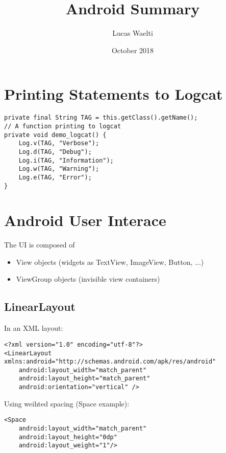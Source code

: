 \documentclass[11pt]{article}
\title{Android Summary}
\author{Lucas Waelti }
\date{October 2018}
\begin{document}
\maketitle
\tableofcontents
\newpage

\begin{comment}
Here is some source code:
\begin{lstlisting}
// Hello.java
import javax.swing.JApplet;
import java.awt.Graphics;

public class Hello extends JApplet {
    public void paintComponent(Graphics g) {
        g.drawString("Hello, world!", 65, 95);
    }
    int a = 10;
}
\end{lstlisting}

That's it folks!
\begin{verbatim}
Or use verbatim to write some pseudocode!
\end{verbatim}
\end{comment}

\section{Printing Statements to Logcat}
\lstset{language = Java}
\begin{lstlisting}
private final String TAG = this.getClass().getName();
// A function printing to logcat
private void demo_logcat() {
    Log.v(TAG, "Verbose");
    Log.d(TAG, "Debug");
    Log.i(TAG, "Information");
    Log.w(TAG, "Warning");
    Log.e(TAG, "Error");
}
\end{lstlisting}

\section{Android User Interace}
The UI is composed of 
\begin{itemize}
    \item View objects (widgets as TextView, ImageView, Button, ...)
    \item ViewGroup objects (invisible view containers)
\end{itemize}

\subsection{LinearLayout}
In an XML layout:
\lstset{language = XML}
\begin{lstlisting}
<?xml version="1.0" encoding="utf-8"?>
<LinearLayout xmlns:android="http://schemas.android.com/apk/res/android"
    android:layout_width="match_parent"
    android:layout_height="match_parent"
    android:orientation="vertical" />
\end{lstlisting}
Using weihted spacing (Space example):
\begin{lstlisting}
<Space
    android:layout_width="match_parent"
    android:layout_height="0dp"
    android:layout_weight="1"/>
\end{lstlisting}
\end{document}
